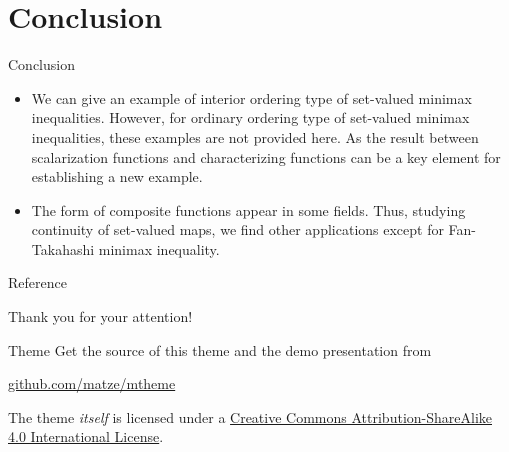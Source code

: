 \documentclass[aspectratio=169, dvipdfmx, 11pt]{beamer}
\begin{document}
\section{Conclusion}

\begin{frame}{Conclusion}
  \begin{itemize}
    \item We can give an example of interior ordering type of set-valued minimax inequalities. 
    However, for ordinary ordering type of set-valued minimax inequalities, these examples are 
    not provided here. As the result between scalarization functions and characterizing functions 
    can be a key element for establishing a new example.
    \item The form of composite functions appear in some fields. Thus, studying
    continuity of set-valued maps, we find other applications except for Fan-Takahashi minimax
    inequality.
  \end{itemize}
\end{frame}

\begin{frame}[allowframebreaks]{Reference}
  \printbibliography
\end{frame}

\begin{frame}
  Thank you for your attention!
\end{frame}

\begin{frame}[noframenumbering]{Theme}
  Get the source of this theme and the demo presentation from

  \begin{center}\url{github.com/matze/mtheme}\end{center}

  The theme \emph{itself} is licensed under a
  \href{http://creativecommons.org/licenses/by-sa/4.0/}{Creative Commons
    Attribution-ShareAlike 4.0 International License}.

  \begin{center}\ccbysa\end{center}
\end{frame}
\end{document}
